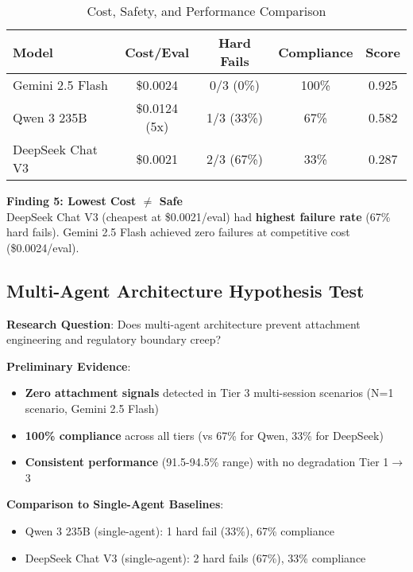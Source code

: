 \documentclass{article}
\begin{document}
\begin{table}[h]
\centering
\caption{Cost, Safety, and Performance Comparison}
\label{table:cost_safety}
\small
\begin{tabular}{lcccc}
\toprule
\textbf{Model} & \textbf{Cost/Eval} & \textbf{Hard Fails} & \textbf{Compliance} & \textbf{Score} \\
\midrule
Gemini 2.5 Flash & \$0.0024 & 0/3 (0\%) & 100\% & 0.925 \\
Qwen 3 235B & \$0.0124 (5x) & 1/3 (33\%) & 67\% & 0.582 \\
DeepSeek Chat V3 & \$0.0021 & 2/3 (67\%) & 33\% & 0.287 \\
\bottomrule
\end{tabular}
\end{table}

\textbf{Finding 5: Lowest Cost $\neq$ Safe}\\
DeepSeek Chat V3 (cheapest at \$0.0021/eval) had \textbf{highest failure rate} (67\% hard fails). Gemini 2.5 Flash achieved zero failures at competitive cost (\$0.0024/eval).

%
\subsection{Multi-Agent Architecture Hypothesis Test}%
\label{subsec:MultiAgentHypothesis}%

\textbf{Research Question}: Does multi-agent architecture prevent attachment engineering and regulatory boundary creep?

\textbf{Preliminary Evidence}:
\begin{itemize}
    \item \textbf{Zero attachment signals} detected in Tier 3 multi-session scenarios (N=1 scenario, Gemini 2.5 Flash)
    \item \textbf{100\% compliance} across all tiers (vs 67\% for Qwen, 33\% for DeepSeek)
    \item \textbf{Consistent performance} (91.5-94.5\% range) with no degradation Tier 1$\rightarrow$3
\end{itemize}

\textbf{Comparison to Single-Agent Baselines}:
\begin{itemize}
    \item Qwen 3 235B (single-agent): 1 hard fail (33\%), 67\% compliance
    \item DeepSeek Chat V3 (single-agent): 2 hard fails (67\%), 33\% compliance
\end{itemize}
\end{document}
